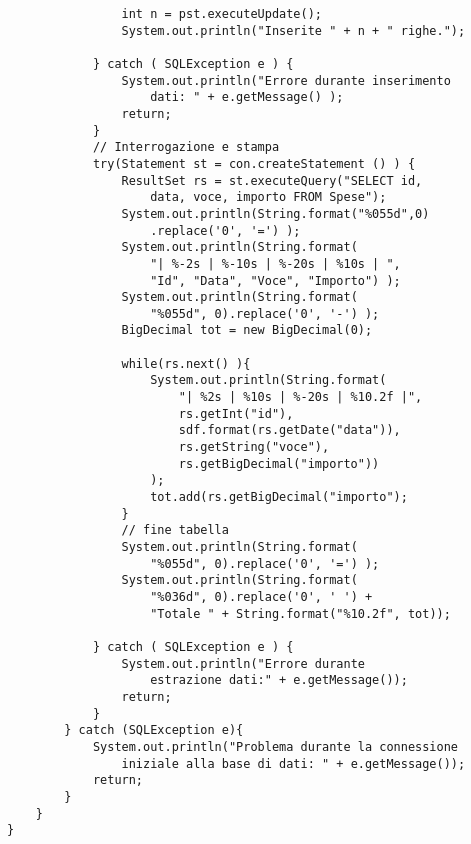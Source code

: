 \documentclass[a4paper, 10pt, titlepage]{article}
\begin{document}
\begin{lstlisting}
				int n = pst.executeUpdate();
				System.out.println("Inserite " + n + " righe.");
				
			} catch ( SQLException e ) {
				System.out.println("Errore durante inserimento
					dati: " + e.getMessage() );
				return;
			}			
			// Interrogazione e stampa
			try(Statement st = con.createStatement () ) {
				ResultSet rs = st.executeQuery("SELECT id,
					data, voce, importo FROM Spese");
				System.out.println(String.format("%055d",0)
					.replace('0', '=') );
				System.out.println(String.format(
					"| %-2s | %-10s | %-20s | %10s | ", 
					"Id", "Data", "Voce", "Importo") );
				System.out.println(String.format(
					"%055d", 0).replace('0', '-') );
				BigDecimal tot = new BigDecimal(0);
				
				while(rs.next() ){
					System.out.println(String.format(
						"| %2s | %10s | %-20s | %10.2f |",
						rs.getInt("id"), 
						sdf.format(rs.getDate("data")), 
						rs.getString("voce"), 
						rs.getBigDecimal("importo"))
					);
					tot.add(rs.getBigDecimal("importo");
				}		
				// fine tabella
				System.out.println(String.format(
					"%055d", 0).replace('0', '=') );
				System.out.println(String.format(
					"%036d", 0).replace('0', ' ') + 
					"Totale " + String.format("%10.2f", tot));
					
			} catch ( SQLException e ) {
				System.out.println("Errore durante 
					estrazione dati:" + e.getMessage());
				return;
			}
		} catch (SQLException e){
			System.out.println("Problema durante la	connessione 
				iniziale alla base di dati: " + e.getMessage());
			return;
		}
	}
}
\end{lstlisting}
\end{document}
